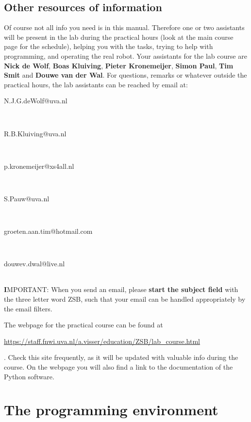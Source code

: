\documentclass[10pt]{scrartcl}
\begin{document}
\subsection{Other resources of information}
Of course not all info you need is in this manual. Therefore one or two 
assistants will be present in the lab during the practical hours (look at
the main course page for the schedule), helping you with the tasks,
trying to help with programming, and operating the real robot. 
Your assistants for the lab course are {\bfseries Nick de Wolf}, {\bfseries Boas Kluiving}, {\bfseries Pieter Kronemeijer}, {\bfseries Simon Paul}, {\bfseries Tim Smit} and {\bfseries Douwe van der Wal}.
For questions, remarks or whatever outside the practical hours, the lab assistants can
be reached by email at:
\\\centerline{{\ttfamily N.J.G.deWolf@uva.nl}}
\\\centerline{{\ttfamily R.B.Kluiving@uva.nl}}
\\\centerline{{\ttfamily p.kronemeijer@xs4all.nl}}
\\\centerline{{\ttfamily S.Pauw@uva.nl}}
\\\centerline{{\ttfamily groeten.aan.tim@hotmail.com}}
\\\centerline{{\ttfamily douwev.dwal@live.nl}}
\\


{\textbf IMPORTANT:} When you send an email, please {\bfseries start the subject field} with the
three letter word
{\ttfamily ZSB}, such that your email can be handled appropriately by the 
email filters.

The webpage for the practical course can be found at \\
\centerline{\url{https://staff.fnwi.uva.nl/a.visser/education/ZSB/lab_course.html}}.
Check this site frequently, as it will be
updated with valuable info during the course. 
On the webpage you will also
find a link to the documentation of the Python software.

%



\section{The programming environment}
\label{sec:programmingenvironment}
\end{document}
